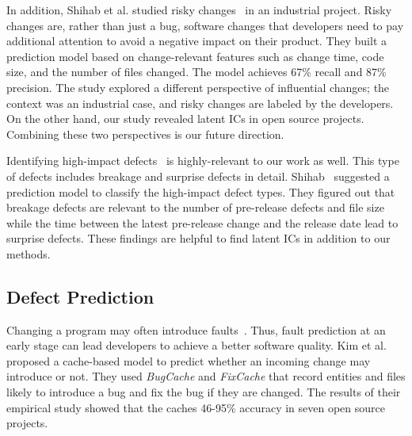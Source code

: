 
In addition, Shihab et al. studied risky changes~\cite{shihab_industrial_2012} in an industrial project. Risky changes are, rather than just a bug, software changes that developers need to pay additional attention to avoid a negative impact on their product. They built a prediction model based on change-relevant features such as change time, code size, and the number of files changed. The model achieves 67\% recall and 87\% precision. The study explored a different perspective of influential changes; the context was an industrial case, and risky changes are labeled by the developers. On the other hand, our study revealed latent ICs in open source projects. Combining these two perspectives is our future direction.

Identifying high-impact defects~\cite{shihab_high-impact_2011} is highly-relevant to our work as well. This type of defects includes breakage and surprise defects in detail. Shihab~\cite{shihab_high-impact_2011} suggested a prediction model to classify the high-impact defect types. They figured out that breakage defects are relevant to the number of pre-release defects and file size while the time between the latest pre-release change and the release date lead to surprise defects. These findings are helpful to find latent ICs in addition to our methods.



\subsection{Defect Prediction}

Changing a program may often introduce
faults~\cite{sliwerski_hatari:_2005,kim_automatic_2006}.
Thus, fault prediction at an early stage can lead developers to achieve
a better software quality. Kim et al.~\cite{kim_predicting_2007} proposed a
cache-based model to predict whether an incoming change may introduce or not.
They used \emph{BugCache} and \emph{FixCache} that record entities and files
likely to introduce a bug and fix the bug if they are changed. The results of
their empirical study showed that the caches 46-95\% accuracy in seven open
source projects.

